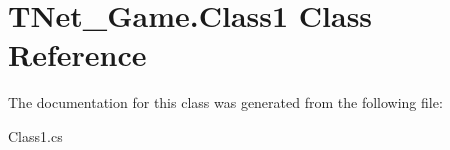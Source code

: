\hypertarget{class_t_net___game_1_1_class1}{}\section{T\+Net\+\_\+\+Game.\+Class1 Class Reference}
\label{class_t_net___game_1_1_class1}


The documentation for this class was generated from the following file\+:\begin{DoxyCompactItemize}
\item 
Class1.\+cs\end{DoxyCompactItemize}
